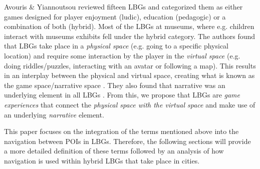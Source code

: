 

Avouris \& Yiannoutsou reviewed fifteen LBGs and categorized them as either games designed for player enjoyment (ludic), education (pedagogic) or a combination of both (hybrid). Most of the LBGs at museums, where e.g. children interact with museums exhibits fell under the hybrid category. The authors found that LBGs take place in a \textit{physical space} (e.g. going to a specific physical location) and require some interaction by the player in the \textit{virtual space} (e.g. doing riddles/puzzles, interacting with an avatar or following a map). This results in an interplay between the physical and virtual space, creating what is known as the game space/narrative space \cite{LBG_Review}. They also found that narrative was an underlying element in all LBGs \cite{LBG_Review}. From this, we propose that LBGs are \textit{game experiences} that connect the \textit{physical space with the virtual space} and make use of an underlying \textit{narrative} element.

This paper focuses on the integration of the terms mentioned above into the navigation between POIs in LBGs. Therefore, the following sections will provide a more detailed definition of these terms followed by an analysis of how navigation is used within hybrid LBGs that take place in cities.